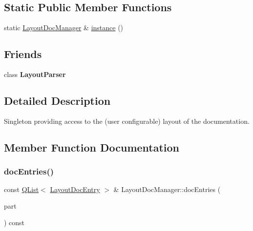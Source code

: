 \subsection*{Static Public Member Functions}
\begin{DoxyCompactItemize}
\item 
static \mbox{\hyperlink{class_layout_doc_manager}{Layout\+Doc\+Manager}} \& \mbox{\hyperlink{class_layout_doc_manager_a87bc2288833b8769bd03e47c58fbba6a}{instance}} ()
\end{DoxyCompactItemize}
\subsection*{Friends}
\begin{DoxyCompactItemize}
\item 
\mbox{\label{class_layout_doc_manager_aaa876b66a7f0c8c8766635655c0dff49}} 
class {\bfseries Layout\+Parser}
\end{DoxyCompactItemize}


\subsection{Detailed Description}
Singleton providing access to the (user configurable) layout of the documentation. 

\subsection{Member Function Documentation}
\mbox{\label{class_layout_doc_manager_aef7fca7915e8c72f55fd32e70988d191}} 
\subsubsection{\texorpdfstring{docEntries()}{docEntries()}}
{\footnotesize\ttfamily const \mbox{\hyperlink{class_q_list}{Q\+List}}$<$ \mbox{\hyperlink{struct_layout_doc_entry}{Layout\+Doc\+Entry}} $>$ \& Layout\+Doc\+Manager\+::doc\+Entries (\begin{DoxyParamCaption}\item[{Layout\+Doc\+Manager\+::\+Layout\+Part}]{part }\end{DoxyParamCaption}) const}

